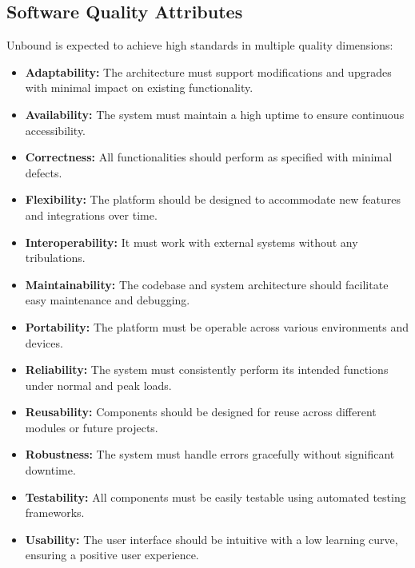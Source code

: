 \documentclass[a4paper,12pt]{article}
\begin{document}
\subsection{Software Quality Attributes}
Unbound is expected to achieve high standards in multiple quality dimensions:
\begin{itemize}
    \item \textbf{Adaptability:} The architecture must support modifications and upgrades with minimal impact on existing functionality.
    \item \textbf{Availability:} The system must maintain a high uptime to ensure continuous accessibility.
    \item \textbf{Correctness:} All functionalities should perform as specified with minimal defects.
    \item \textbf{Flexibility:} The platform should be designed to accommodate new features and integrations over time.
    \item \textbf{Interoperability:} It must work with external systems without any tribulations.
    \item \textbf{Maintainability:} The codebase and system architecture should facilitate easy maintenance and debugging.
    \item \textbf{Portability:} The platform must be operable across various environments and devices.
    \item \textbf{Reliability:} The system must consistently perform its intended functions under normal and peak loads.
    \item \textbf{Reusability:} Components should be designed for reuse across different modules or future projects.
    \item \textbf{Robustness:} The system must handle errors gracefully without significant downtime.
    \item \textbf{Testability:} All components must be easily testable using automated testing frameworks.
    \item \textbf{Usability:} The user interface should be intuitive with a low learning curve, ensuring a positive user experience.
\end{itemize}
\end{document}
